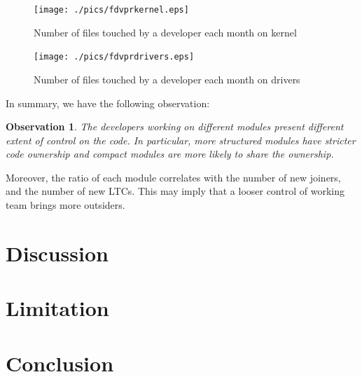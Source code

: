 \documentclass{sig-alternate-05-2015}
\newtheorem{observation}{\bf Observation}
\begin{document}
\begin{figure}
\centering
\texttt{[image: ./pics/fdvprkernel.eps]} %
\caption{Number of files touched by a developer each month on kernel}
\label{fig:productivitykernel}
\end{figure}

\begin{figure}
\centering
\texttt{[image: ./pics/fdvprdrivers.eps]} %
\caption{Number of files touched by a developer each month on drivers}
\label{fig:productivitydrivers}
\end{figure}

In summary, we have the following observation:
\begin{observation}\label{o:2}
\emph{The developers working on different modules present different extent of control
on the code. In particular, more structured modules have stricter code ownership
and compact modules are more likely to share the ownership.} 
\end{observation}

Moreover, the ratio of each module correlates with the number of new joiners,
and the number of new LTCs. This may imply that a looser control of working team
brings more outsiders.

\section{Discussion}\label{s:discussion}

\section{Limitation}\label{s:limitation}

\section{Conclusion}\label{s:conclusion}


 
\end{document}
